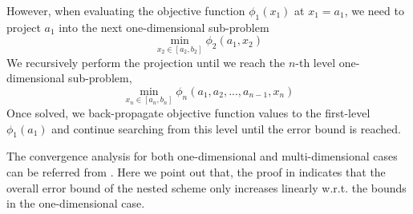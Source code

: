 However, when evaluating the objective function $\phi_1({x}_1)$ at ${x}_1=a_1$, we need to project $a_1$ into the next one-dimensional sub-problem $$\min_{{x}_2\in [a_2,b_2]}\phi_2(a_1,{x}_2)$$ We recursively perform the projection until we reach the $n$-th level one-dimensional sub-problem, $$\min_{{x}_n\in [a_n,b_n]}\phi_n(a_1, a_2,..., a_{n-1},{x}_n)$$ 
Once solved,
we back-propagate objective function values to the first-level $\phi_1(a_1)$ and continue searching from this level until the error bound is reached.

The convergence analysis for both one-dimensional and multi-dimensional cases can be referred from \cite{RHK2018}. Here we point out that, the proof in \cite{RHK2018} indicates that the overall error bound of the nested scheme only increases linearly w.r.t. the bounds in the one-dimensional case. 






